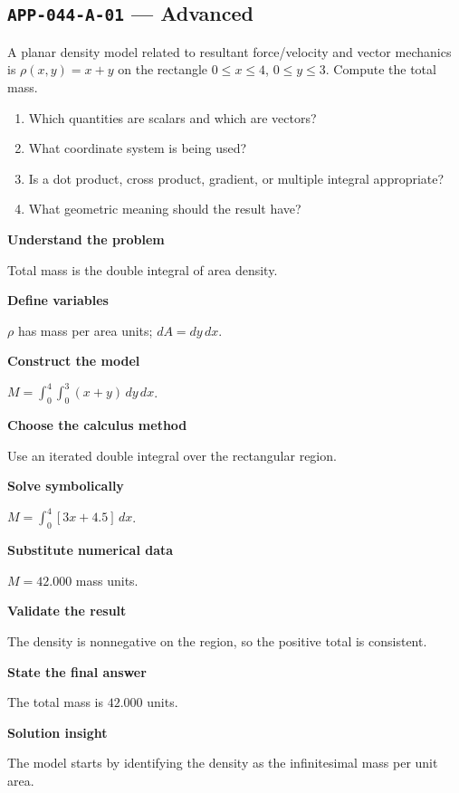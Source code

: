 \documentclass[11pt]{book}
\newcommand{\pid}[1]{\texttt{#1}}
\begin{document}
\subsection*{\pid{APP-044-A-01} — Advanced}
\begin{problembox}
A planar density model related to resultant force/velocity and vector mechanics is $\rho(x,y)=x+y$ on the rectangle $0\le x\le 4$, $0\le y\le 3$. Compute the total mass.
\end{problembox}
\begin{promptbox}\begin{enumerate}
\item Which quantities are scalars and which are vectors?
\item What coordinate system is being used?
\item Is a dot product, cross product, gradient, or multiple integral appropriate?
\item What geometric meaning should the result have?
\end{enumerate}\end{promptbox}
\begin{solutionbox}
\textbf{Understand the problem}\par Total mass is the double integral of area density.\par\medskip
\textbf{Define variables}\par $\rho$ has mass per area units; $dA=dy\,dx$.\par\medskip
\textbf{Construct the model}\par $M=\int_0^{4}\int_0^{3}(x+y)\,dy\,dx$.\par\medskip
\textbf{Choose the calculus method}\par Use an iterated double integral over the rectangular region.\par\medskip
\textbf{Solve symbolically}\par $M=\int_0^{4}[3x+4.5]\,dx$.\par\medskip
\textbf{Substitute numerical data}\par $M=42.000$ mass units.\par\medskip
\textbf{Validate the result}\par The density is nonnegative on the region, so the positive total is consistent.\par\medskip
\textbf{State the final answer}\par The total mass is $42.000$ units.\par\medskip
\textbf{Solution insight}\par The model starts by identifying the density as the infinitesimal mass per unit area.\par\medskip
\end{solutionbox}
\end{document}
